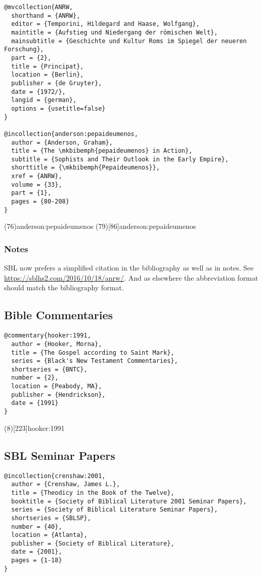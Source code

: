 \documentclass[a4paper]{article}
\begin{document}
\begin{verbatim}
@mvcollection{ANRW,
  shorthand = {ANRW},
  editor = {Temporini, Hildegard and Haase, Wolfgang},
  maintitle = {Aufstieg und Niedergang der römischen Welt},
  mainsubtitle = {Geschichte und Kultur Roms im Spiegel der neueren Forschung},
  part = {2},
  title = {Principat},
  location = {Berlin},
  publisher = {de Gruyter},
  date = {1972/},
  langid = {german},
  options = {usetitle=false}
}

@incollection{anderson:pepaideumenos,
  author = {Anderson, Graham},
  title = {The \mkbibemph{pepaideumenos} in Action},
  subtitle = {Sophists and Their Outlook in the Early Empire},
  shorttitle = {\mkbibemph{Pepaideumenos}},
  xref = {ANRW},
  volume = {33},
  part = {1},
  pages = {80-208}
}
\end{verbatim}

\examplecite(76){anderson:pepaideumenos}
\examplecite(79)[86]{anderson:pepaideumenos}
\exampleabbreviations
\examplebibliography

\subsubsection{Notes}

SBL now prefers a simplified citation in the bibliography as well as in notes.
See \url{https://sblhs2.com/2016/10/18/anrw/}. And as elsewhere the
abbreviation format should match the bibliography format.

\subsection{Bible Commentaries}

\begin{verbatim}
@commentary{hooker:1991,
  author = {Hooker, Morna},
  title = {The Gospel according to Saint Mark},
  series = {Black's New Testament Commentaries},
  shortseries = {BNTC},
  number = {2},
  location = {Peabody, MA},
  publisher = {Hendrickson},
  date = {1991}
}
\end{verbatim}

\examplecite(8)[223]{hooker:1991}
\exampleabbreviations
\examplebibliography

\subsection{SBL Seminar Papers}

\begin{verbatim}
@incollection{crenshaw:2001,
  author = {Crenshaw, James L.},
  title = {Theodicy in the Book of the Twelve},
  booktitle = {Society of Biblical Literature 2001 Seminar Papers},
  series = {Society of Biblical Literature Seminar Papers},
  shortseries = {SBLSP},
  number = {40},
  location = {Atlanta},
  publisher = {Society of Biblical Literature},
  date = {2001},
  pages = {1-18}
}
\end{verbatim}
\end{document}
